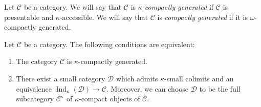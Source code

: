 \documentclass[a4paper,dvipdfmx,11pt,reqno]{amsart}
\DeclareMathOperator{\Ind}{Ind}
\newcommand{\C}{\mathcal{C}}
\newcommand{\D}{\mathcal{D}}
\begin{document}
\begin{definition}
  Let $\C$ be a category.
  We will say that $\C$ is \textit{$\kappa$-compactly generated} if $\C$ is presentable and $\kappa$-accessible.
  We will say that $\C$ is \textit{compactly generated} if it is $\omega$-compactly generated.
\end{definition}

\begin{proposition}
  Let $\C$ be a category.
  The following conditions are equivalent:
  \begin{enumerate}
    \item The category $\C$ is $\kappa$-compactly generated.
    \item There exist a small category $\D$ which admits $\kappa$-small colimits and an equivalence $\Ind_{\kappa}(\D) \to \C$. 
    Moreover, we can choose $\D$ to be the full subcategory $\C^{\kappa}$ of $\kappa$-compact objects of $\C$.
  \end{enumerate}
\end{proposition}
 


\end{document}
